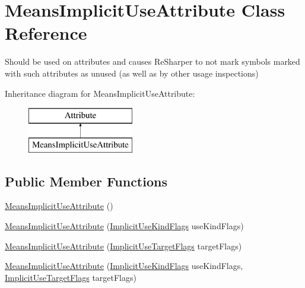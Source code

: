 \hypertarget{class_means_implicit_use_attribute}{}\section{Means\+Implicit\+Use\+Attribute Class Reference}
\label{class_means_implicit_use_attribute}


Should be used on attributes and causes Re\+Sharper to not mark symbols marked with such attributes as unused (as well as by other usage inspections)  


Inheritance diagram for Means\+Implicit\+Use\+Attribute\+:\begin{figure}[H]
\begin{center}
\leavevmode
\includegraphics[height=2.000000cm]{class_means_implicit_use_attribute}
\end{center}
\end{figure}
\subsection*{Public Member Functions}
\begin{DoxyCompactItemize}
\item 
\hyperlink{class_means_implicit_use_attribute_ae37aa98103c42c47a777628dcbbc775b}{Means\+Implicit\+Use\+Attribute} ()
\item 
\hyperlink{class_means_implicit_use_attribute_af0c6d4beebf8b380eaf035edd09300a7}{Means\+Implicit\+Use\+Attribute} (\hyperlink{_annotations_8cs_acc26806cec0b003502b38c6c2ee67fd1}{Implicit\+Use\+Kind\+Flags} use\+Kind\+Flags)
\item 
\hyperlink{class_means_implicit_use_attribute_a8f8f931eac84355d49a80623c3a111f6}{Means\+Implicit\+Use\+Attribute} (\hyperlink{_annotations_8cs_a59f21202ead30f3d1e2093e42214bf7c}{Implicit\+Use\+Target\+Flags} target\+Flags)
\item 
\hyperlink{class_means_implicit_use_attribute_afca4dbb9e0585f981db7b5b29ff4f664}{Means\+Implicit\+Use\+Attribute} (\hyperlink{_annotations_8cs_acc26806cec0b003502b38c6c2ee67fd1}{Implicit\+Use\+Kind\+Flags} use\+Kind\+Flags, \hyperlink{_annotations_8cs_a59f21202ead30f3d1e2093e42214bf7c}{Implicit\+Use\+Target\+Flags} target\+Flags)
\end{DoxyCompactItemize}
